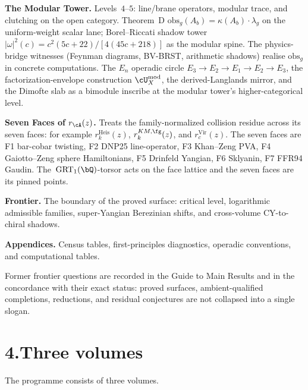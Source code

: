 \medskip

\noindent\textbf{The Modular Tower.}\enspace
Levels~$4$--$5$: line/brane operators, modular trace, and clutching
on the open category. Theorem~D
$\mathrm{obs}_g(A_b) = \kappa(A_b) \cdot \lambda_g$ on the
uniform-weight scalar lane; Borel--Riccati shadow tower
$|\omega|^2(c) = c^2(5c+22)/[4(45c+218)]$ as the modular spine.
The physics-bridge witnesses (Feynman diagrams, BV-BRST, arithmetic
shadows) realise $\mathrm{obs}_g$ in concrete computations. The
$E_n$ operadic circle $E_3 \to E_2 \to E_1 \to E_2 \to E_3$, the
factorization-envelope construction $\cU^{\mathrm{mod}}_X$, the
derived-Langlands mirror, and the Dimofte slab as a bimodule
inscribe at the modular tower's higher-categorical level.

\medskip

\noindent\textbf{Seven Faces of $r_\cA(z)$.}\enspace
Treats the family-normalized collision residue across its seven faces:
for example $r^{\mathrm{Heis}}_k(z)$, $r^{KM,\fg}_k(z)$, and
$r^{\mathrm{Vir}}_c(z)$. The seven faces are F1
bar-cobar twisting, F2 DNP25 line-operator, F3 Khan--Zeng
PVA, F4 Gaiotto--Zeng sphere Hamiltonians, F5 Drinfeld Yangian, F6
Sklyanin, F7 FFR94 Gaudin. The~$\GRTone(\bQ)$-torsor acts on the
face lattice and the seven faces are its pinned points.

\medskip

\noindent\textbf{Frontier.}\enspace
The boundary of the proved surface: critical level, logarithmic
admissible families, super-Yangian Berezinian shifts, and
cross-volume CY-to-chiral shadows.

\medskip

\noindent\textbf{Appendices.}\enspace
Census tables, first-principles diagnostics, operadic conventions, and
computational tables.

\medskip

Former frontier questions are recorded in the Guide to Main Results
and in the concordance with their exact status: proved surfaces,
ambient-qualified completions, reductions, and residual conjectures
are not collapsed into a single slogan.

\section*{4.\quad Three volumes}

\noindent
The programme consists of three volumes.

\medskip

